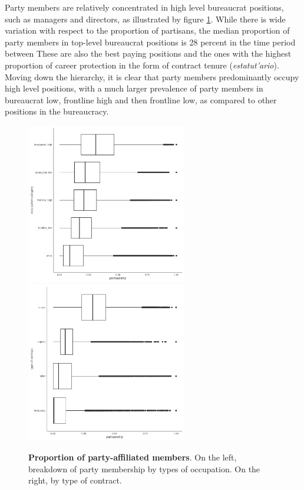 \documentclass[12pt,a4paper]{article}
\begin{document}
Party members are relatively concentrated in high level bureaucrat positions, such as managers and directors, as illustrated by figure \ref{fig:partisan_breakdown}. While there is wide variation with respect to the proportion of partisans, the median proportion of party members in top-level bureaucrat positions is 28 percent in the time period between  These are also the best paying positions and the ones with the highest proportion of career protection in the form of contract tenure (\emph{estatut'{a}rio}). Moving down the hierarchy, it is clear that party members predominantly occupy high level positions, with a much larger prevalence of party members in bureaucrat low, frontline high and then frontline low, as compared to other positions in the bureaucracy.

\begin{figure}[H]
    \centering
    \includegraphics[width = 7cm, height = 7cm]{figures/partisanship/plot_partisanship_by_cbo_group.pdf}
    \includegraphics[width = 7cm, height = 7cm]{figures/partisanship/plot_partisanship_by_contract_type.pdf}
    \caption{\textbf{Proportion of party-affiliated members}. On the left, breakdown of party membership by types of occupation. On the right, by type of contract.}
    \label{fig:partisan_breakdown}
\end{figure}
\end{document}
